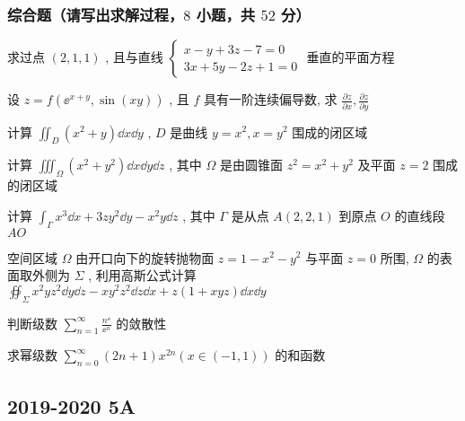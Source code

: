 \subsubsection{综合题（请写出求解过程，$8$ 小题，共 $52$ 分）}
\begin{ti}[$6$ 分]
	求过点 $(2,1,1)$ , 且与直线 $\begin{cases}
		x-y+3 z-7=0\\
		3 x+5 y-2 z+1=0
	\end{cases}$ 垂直的平面方程
\end{ti}

\begin{ti}[$6$ 分]
	设 $z=f\left(\ee^{x+y}, \sin (x y)\right)$ , 且 $f$ 具有一阶连续偏导数, 求 $\frac{\partial z}{\partial x}, \frac{\partial z}{\partial y}$
\end{ti}

\begin{ti}[$8$ 分]
	计算 $\iint_{D}\left(x^{2}+y\right) \dd{x} \dd{y}$ , $D$ 是曲线 $y=x^{2}, x=y^{2}$ 围成的闭区域
\end{ti}

\begin{ti}[$6$ 分]
	计算 $\iiint_{\Omega}\left(x^{2}+y^{2}\right) \dd{x} \dd{y} \dd{z}$ , 其中 $\Omega$ 是由圆锥面 $z^{2}=x^{2}+y^{2}$ 及平面 $z=2$ 围成的闭区域
\end{ti}

\begin{ti}[$6$ 分]
	计算 $\int_{\Gamma} x^{3} \dd{x}+3 z y^{2} \dd{y}-x^{2} y \dd{z}$ , 其中 $\Gamma$ 是从点 $A(2,2,1)$ 到原点 $O$ 的直线段 $AO$
\end{ti}

\begin{ti}[$8$ 分]
	空间区域 $\Omega$ 由开口向下的旋转抛物面 $z=1-x^{2}-y^{2}$ 与平面 $z=0$ 所围, $\Omega$ 的表面取外侧为 $\Sigma$ , 利用高斯公式计算 $\oiint_{\Sigma} x^{2} y z^{2} \dd{y} \dd{z}-x y^{2} z^{2} \dd{z} \dd{x}+z(1+x y z) \dd{x} \dd{y}$
\end{ti}

\begin{ti}[$6$ 分]
	判断级数 $\sum_{n=1}^{\infty} \frac{n^{\ee}}{\ee^{n}}$ 的敛散性
\end{ti}

\begin{ti}[$6$ 分]
	求幂级数 $\sum_{n=0}^{\infty}(2 n+1) x^{2 n}(x \in(-1,1))$ 的和函数
\end{ti}

\subsection{2019-2020 5A}
